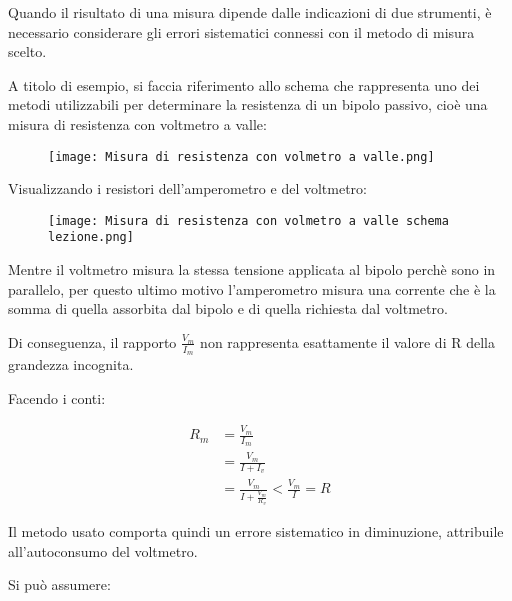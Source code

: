Quando il risultato di una misura dipende dalle indicazioni di due strumenti, 
è necessario considerare gli errori sistematici connessi con il metodo di misura scelto. \newline 

A titolo di esempio, si faccia riferimento allo schema che rappresenta uno dei metodi utilizzabili per determinare la resistenza di un bipolo passivo, 
cioè una misura di resistenza con voltmetro a valle: 

\begin{figure}[h]
    \centering
    \texttt{[image: Misura di resistenza con volmetro a valle.png]}
\end{figure}

Visualizzando i resistori dell'amperometro e del voltmetro: 

\begin{figure}[h]
    \centering
    \texttt{[image: Misura di resistenza con volmetro a valle schema lezione.png]}
\end{figure}

Mentre il voltmetro misura la stessa tensione applicata al bipolo perchè sono in parallelo, 
per questo ultimo motivo l'amperometro misura una corrente che è la somma di quella assorbita dal bipolo e di quella richiesta dal voltmetro. \newline 

Di conseguenza, il rapporto $\frac{V_m}{I_m}$ non rappresenta esattamente il valore di R della grandezza incognita. \newline 

Facendo i conti: 

{
    \Large 
    \begin{equation}
        \begin{split}
            R_m 
            &= 
            \frac{V_m}{I_m}
            \\ 
            &= 
            \frac{V_m}{I + I_v} 
            \\ 
            &= 
            \frac{V_m}{I + \frac{V_m}{R_v}} 
            < 
            \frac{V_m}{I} 
            = 
            R
        \end{split}
    \end{equation}
}

Il metodo usato comporta quindi un errore sistematico in diminuzione, 
attribuile all'autoconsumo del voltmetro. \newline 

Si può assumere:

